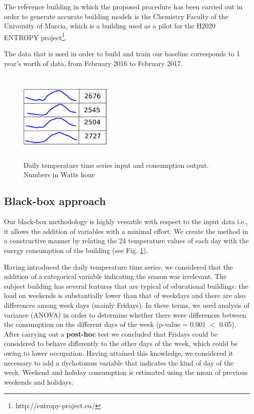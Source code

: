 \documentclass[10pt, conference, compsocconf]{IEEEtran}
\begin{document}
The reference building in which the proposed procedure has been carried out in order to generate accurate building models is the Chemistry Faculty of the University of Murcia, which is a building used as a pilot for the H2020 ENTROPY project\footnote{http://entropy-project.eu/}.  

The data that is used in order to build and train our baseline corresponds to 1 year's worth of data, from February 2016 to February 2017. 

\begin{figure}[h]%
\centering
\centerline{\includegraphics[width=4.5cm,height=4.5cm,keepaspectratio]{./pics/table_inputs_outputs.pdf}}
\caption{Daily temperature time series input and consumption output. Numbers in Watts hour}\vspace*{-6pt}
  \label{fig:inout}
\end{figure}

\subsection{Black-box approach}

Our black-box methodology is highly versatile with respect to the input data i.e.,  it allows the addition of variables with a minimal effort. We create the method in a constructive manner by relating the 24 temperature values of each day with the energy consumption of the building (see Fig. \ref{fig:inout}).

Having introduced the daily temperature time series, we considered that the addition of a categorical variable indicating the season was irrelevant. The subject building has several features that are typical of educational buildings: the load %
on weekends is substantially lower than that of weekdays and there are also differences among week days (mainly Fridays).
In these terms, we used analysis of variance (ANOVA) in order to determine whether there were differences between the consumption on the different days of the week (p-value = 0.001 $<$ 0.05). After carrying out a \textbf{post-hoc}  test we concluded that Fridays could be considered to behave differently to the other days of the week, which could be owing to lower occupation. Having attained this knowledge, we considered it necessary to add a dychotomus variable that indicates the kind of day of the week. Weekend and holiday consumption is estimated using the mean of previous weekends and holidays.
\end{document}
